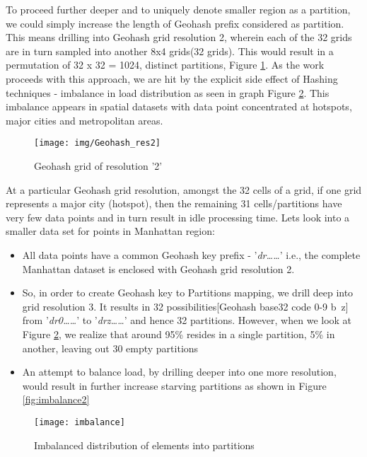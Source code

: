 \documentclass[article,type=msc,colorback,12pt,accentcolor=tud1d]{tudthesis}
\begin{document}
		To proceed further deeper and to uniquely denote smaller region as a partition, we could simply increase the length of Geohash prefix considered as partition. This means drilling into Geohash grid resolution 2, wherein each of the 32 grids are in turn  sampled into another 8x4 grids(32 grids). This would result in a permutation of 32 x 32 = 1024, distinct partitions, Figure \ref{fig:Geohash_res2}. As the work proceeds with this approach, we are hit by the explicit side effect of Hashing techniques - imbalance in load distribution as seen in graph Figure \ref{fig:imbalance}. This imbalance appears in spatial datasets with data point concentrated at hotspots, major cities and metropolitan areas. 
		
			\begin{figure}[h]
				\centering
				\texttt{[image: img/Geohash\_res2]}
				\caption{Geohash grid of resolution '2'}
				\label{fig:Geohash_res2}
			\end{figure}
		
		
		At a particular Geohash grid resolution, amongst the 32 cells of a grid, if one grid represents a major city (hotspot), then the remaining 31 cells/partitions have very few data points and in turn result in idle processing time. Lets look into a smaller data set for points in Manhattan region:
		
		\begin{itemize}
			\item All data points have a common Geohash key prefix - '\textit{dr\dots\dots}' i.e., the complete Manhattan dataset is enclosed with Geohash grid resolution 2.
			
			\item So, in order to create Geohash key to Partitions mapping, we drill deep into grid resolution 3. It results in 32 possibilities[Geohash base32 code 0-9 b~z] from '\textit{dr0\dots\dots}' to '\textit{drz\dots\dots}' and hence 32 partitions. However, when we look at Figure \ref{fig:imbalance}, we realize that around 95\% resides in a single partition, 5\% in another, leaving out 30 empty partitions
				
			\item An attempt to balance load, by drilling deeper into one more resolution, would result in further increase starving partitions as shown in Figure \ref{fig:imbalance2}
		\end{itemize}
							
				\begin{figure}[hp]
					\centering
					\texttt{[image: imbalance]}
					\caption{Imbalanced distribution of elements into partitions}
					\label{fig:imbalance}
				\end{figure}		
				
\end{document}
